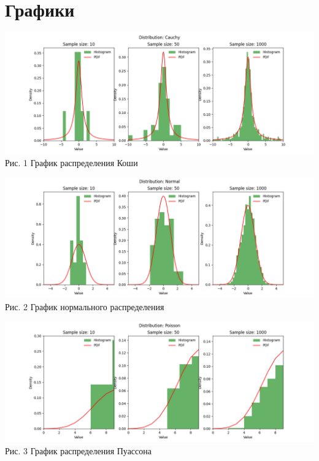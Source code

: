 \documentclass[12pt]{article}
\begin{document}
\section{Графики}

\begin{center}
    \includegraphics[scale=0.6]{lab_1_Cauchy.png} \\
    Рис. 1 График распределения Коши
\end{center}

\begin{center}
    \includegraphics[scale=0.6]{lab_1_Normal.png} \\
    Рис. 2 График нормального распределения
\end{center}

\begin{center}
    \includegraphics[scale=0.6]{lab_1_Poisson.png} \\
    Рис. 3 График распределения Пуассона
\end{center}
\end{document}
